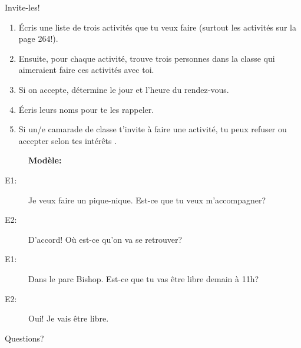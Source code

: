 \documentclass{beamer}
\begin{document}
  \begin{frame}{Invite-les!}
    \small
    \begin{enumerate}
      \item Écris une liste de trois activités que tu veux faire (surtout les activités sur la page 264!).
      \item Ensuite, pour chaque activité, trouve trois personnes dans la classe qui aimeraient faire  ces activités avec toi.
      \item Si on accepte, détermine le jour et l'heure du rendez-vous.
      \item Écris leurs noms pour te les rappeler.
      \item Si un/e camarade de classe t'invite à faire une activité, tu peux refuser ou accepter selon tes intérêts .
    \end{enumerate}
    \begin{description}
      \item[] \textbf{Modèle:}
      \item[E1:] Je veux faire un pique-nique. Est-ce que tu veux m'accompagner?
      \item[E2:] D'accord! Où est-ce qu'on va se retrouver?
      \item[E1:] Dans le parc Bishop. Est-ce que tu vas être libre demain à 11h?
      \item[E2:] Oui! Je vais être libre.
    \end{description}
  \end{frame}

  \begin{frame}{}
    \begin{center}
      \Large Questions?
    \end{center}
  \end{frame}
\end{document}
